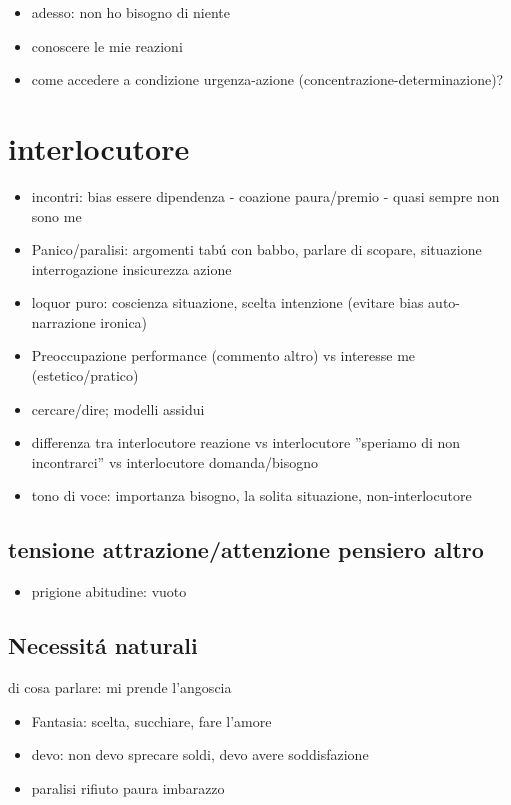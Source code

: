 \begin{itemize}
\item adesso: non ho bisogno di niente
\item conoscere le mie reazioni
\item come accedere a condizione urgenza-azione (concentrazione-determinazione)?
\end{itemize}

\section{interlocutore}

\begin{itemize}
\item incontri: bias essere dipendenza - coazione paura/premio - quasi sempre non sono me
\item Panico/paralisi: argomenti tab\'u con babbo, parlare di scopare, situazione interrogazione insicurezza azione
\item loquor puro: coscienza situazione, scelta intenzione (evitare bias auto-narrazione ironica)
\item Preoccupazione performance (commento altro) vs interesse me (estetico/pratico)
\item cercare/dire; modelli assidui
\item differenza tra interlocutore reazione vs interlocutore ''speriamo di non incontrarci'' vs interlocutore domanda/bisogno
\item tono di voce: importanza bisogno, la solita situazione, non-interlocutore
\end{itemize}

\subsection{tensione attrazione/attenzione pensiero altro}
\begin{itemize}
\item prigione abitudine: vuoto
\end{itemize}


\subsection{Necessit\'a naturali}

di cosa parlare: mi prende l'angoscia
\begin{itemize}
\item Fantasia: scelta, succhiare, fare l'amore
\item devo: non devo sprecare soldi, devo avere soddisfazione
\item paralisi rifiuto paura imbarazzo
\end{itemize}

